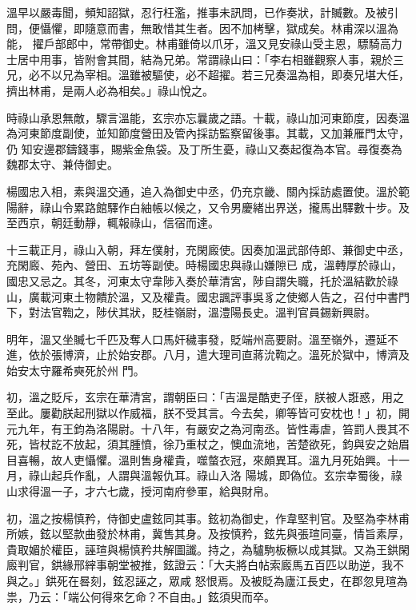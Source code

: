 \begin{pinyinscope}
 溫早以嚴毒聞，頻知詔獄，忍行枉濫，推事未訊問，已作奏狀，計贓數。及被引問，便懾懼，即隨意而書，無敢惜其生者。因不加栲擊，獄成矣。林甫深以溫為能，
 擢戶部郎中，常帶御史。林甫雖倚以爪牙，溫又見安祿山受主恩，驃騎高力士居中用事，皆附會其間，結為兄弟。常謂祿山曰：「李右相雖觀察人事，親於三兄，必不以兄為宰相。溫雖被驅使，必不超擢。若三兄奏溫為相，即奏兄堪大任，擠出林甫，是兩人必為相矣。」祿山悅之。



 時祿山承恩無敵，驟言溫能，玄宗亦忘曩歲之語。十載，祿山加河東節度，因奏溫為河東節度副使，並知節度營田及管內採訪監察留後事。其載，又加兼雁門太守，仍
 知安邊郡鑄錢事，賜紫金魚袋。及丁所生憂，祿山又奏起復為本官。尋復奏為魏郡太守、兼侍御史。



 楊國忠入相，素與溫交通，追入為御史中丞，仍充京畿、關內採訪處置使。溫於範陽辭，祿山令累路館驛作白紬帳以候之，又令男慶緒出界送，攏馬出驛數十步。及至西京，朝廷動靜，輒報祿山，信宿而達。



 十三載正月，祿山入朝，拜左僕射，充閑廄使。因奏加溫武部侍郎、兼御史中丞，充閑廄、苑內、營田、五坊等副使。時楊國忠與祿山嫌隙已
 成，溫轉厚於祿山，國忠又忌之。其冬，河東太守韋陟入奏於華清宮，陟自謂失職，托於溫結歡於祿山，廣載河東土物饋於溫，又及權貴。國忠諷評事吳豸之使鄉人告之，召付中書門下，對法官鞫之，陟伏其狀，貶桂嶺尉，溫澧陽長史。溫判官員錫新興尉。



 明年，溫又坐贓七千匹及奪人口馬奸穢事發，貶端州高要尉。溫至嶺外，遷延不進，依於張博濟，止於始安郡。八月，遣大理司直蔣沇鞫之。溫死於獄中，博濟及始安太守羅希奭死於州
 門。



 初，溫之貶斥，玄宗在華清宮，謂朝臣曰：「吉溫是酷吏子侄，朕被人誑惑，用之至此。屢勸朕起刑獄以作威福，朕不受其言。今去矣，卿等皆可安枕也！」初，開元九年，有王鈞為洛陽尉。十八年，有嚴安之為河南丞。皆性毒虐，笞罰人畏其不死，皆杖訖不放起，須其腫憤，徐乃重杖之，懊血流地，苦楚欲死，鈞與安之始眉目喜暢，故人吏懾懼。溫則售身權貴，噬螫衣冠，來頗異耳。溫九月死始興。十一月，祿山起兵作亂，人謂與溫報仇耳。祿山入洛
 陽城，即偽位。玄宗幸蜀後，祿山求得溫一子，才六七歲，授河南府參軍，給與財帛。



 初，溫之按楊慎矜，侍御史盧鉉同其事。鉉初為御史，作韋堅判官。及堅為李林甫所嫉，鉉以堅款曲發於林甫，冀售其身。及按慎矜，鉉先與張瑄同臺，情旨素厚，貴取媚於權臣，誣瑄與楊慎矜共解圖讖。持之，為驢駒板橛以成其獄。又為王鉷閑廄判官，鉷緣邢縡事朝堂被推，鉉證云：「大夫將白帖索廄馬五百匹以助逆，我不與之。」鉷死在晷刻，鉉忍誣之，眾咸
 怒恨焉。及被貶為廬江長史，在郡忽見瑄為祟，乃云：「端公何得來乞命？不自由。」鉉須臾而卒。




\end{pinyinscope}
